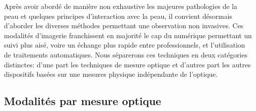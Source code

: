 Après avoir abordé de manière non exhaustive les majeures pathologies de la peau et quelques principes d'interaction avec la peau, il convient désormais d'aborder les diverses méthodes permettant une observation non invasives. Ces modalités d'imagerie franchissent en majorité le cap du numérique permettant un suivi plus aisé, voire un échange plus rapide entre professionnels, et l’utilisation de traitements automatiques. Nous séparerons ces techniques en deux catégories distinctes: d’une part les techniques de mesure optique et d'autres part les autres dispositifs basées sur une mesures physique indépendante de l'optique.\par

\subsection{Modalités par mesure optique}
